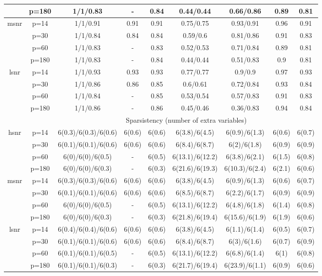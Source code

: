 \begin{table}[ht]
{\begin{tabular}{|c|c|ccccccc|}
   & p=180 & 1/1/0.83 & - & 0.84 & 0.44/0.44 & 0.66/0.86 & 0.89 & 0.81 \\ 
  \midrule\multirow{4}[2]{*}{msnr} & p=14 & 1/1/0.91 & 0.91 & 0.91 & 0.75/0.75 & 0.93/0.91 & 0.96 & 0.91 \\ 
   & p=30 & 1/1/0.84 & 0.84 & 0.84 & 0.59/0.6 & 0.81/0.86 & 0.91 & 0.83 \\ 
   & p=60 & 1/1/0.83 & - & 0.83 & 0.52/0.53 & 0.71/0.84 & 0.89 & 0.81 \\ 
   & p=180 & 1/1/0.83 & - & 0.84 & 0.44/0.44 & 0.51/0.83 & 0.9 & 0.81 \\ 
  \midrule\multirow{4}[2]{*}{lsnr} & p=14 & 1/1/0.93 & 0.93 & 0.93 & 0.77/0.77 & 0.9/0.9 & 0.97 & 0.93 \\ 
   & p=30 & 1/1/0.86 & 0.86 & 0.85 & 0.6/0.61 & 0.72/0.84 & 0.93 & 0.84 \\ 
   & p=60 & 1/1/0.84 & - & 0.85 & 0.53/0.54 & 0.57/0.83 & 0.91 & 0.83 \\ 
   & p=180 & 1/1/0.86 & - & 0.86 & 0.45/0.46 & 0.36/0.83 & 0.94 & 0.84 \\ 
   \midrule 
 \multicolumn{1}{|c}{} &       & \multicolumn{7}{c|}{Sparsistency (number of extra variables)} \\
\midrule\multirow{4}[2]{*}{hsnr} & p=14 & 6(0.3)/6(0.3)/6(0.6) & 6(0.6) & 6(0.6) & 6(3.8)/6(4.5) & 6(0.9)/6(1.3) & 6(0.6) & 6(0.7) \\ 
   & p=30 & 6(0.1)/6(0.1)/6(0.6) & 6(0.6) & 6(0.6) & 6(8.4)/6(8.7) & 6(2)/6(1.8) & 6(0.9) & 6(0.9) \\ 
   & p=60 & 6(0)/6(0)/6(0.5) & - & 6(0.5) & 6(13.1)/6(12.2) & 6(3.8)/6(2.1) & 6(1.5) & 6(0.8) \\ 
   & p=180 & 6(0)/6(0)/6(0.3) & - & 6(0.3) & 6(21.6)/6(19.3) & 6(10.3)/6(2.4) & 6(2.1) & 6(0.6) \\ 
  \midrule\multirow{4}[2]{*}{msnr} & p=14 & 6(0.3)/6(0.3)/6(0.6) & 6(0.6) & 6(0.6) & 6(3.8)/6(4.5) & 6(0.9)/6(1.3) & 6(0.6) & 6(0.7) \\ 
   & p=30 & 6(0.1)/6(0.1)/6(0.6) & 6(0.6) & 6(0.6) & 6(8.5)/6(8.7) & 6(2.2)/6(1.7) & 6(0.9) & 6(0.9) \\ 
   & p=60 & 6(0)/6(0)/6(0.5) & - & 6(0.5) & 6(13.1)/6(12.2) & 6(4.8)/6(1.8) & 6(1.4) & 6(0.8) \\ 
   & p=180 & 6(0)/6(0)/6(0.3) & - & 6(0.3) & 6(21.8)/6(19.4) & 6(15.6)/6(1.9) & 6(1.9) & 6(0.6) \\ 
  \midrule\multirow{4}[2]{*}{lsnr} & p=14 & 6(0.4)/6(0.4)/6(0.6) & 6(0.6) & 6(0.6) & 6(3.8)/6(4.5) & 6(1.1)/6(1.4) & 6(0.5) & 6(0.7) \\ 
   & p=30 & 6(0.1)/6(0.1)/6(0.6) & 6(0.6) & 6(0.6) & 6(8.4)/6(8.7) & 6(3)/6(1.6) & 6(0.7) & 6(0.9) \\ 
   & p=60 & 6(0.1)/6(0.1)/6(0.5) & - & 6(0.5) & 6(13.1)/6(12.2) & 6(6.8)/6(1.4) & 6(1) & 6(0.8) \\ 
   & p=180 & 6(0.1)/6(0.1)/6(0.3) & - & 6(0.3) & 6(21.7)/6(19.4) & 6(23.9)/6(1.1) & 6(0.9) & 6(0.6) \\ 
   \bottomrule 
\end{tabular}
}
\end{table}
